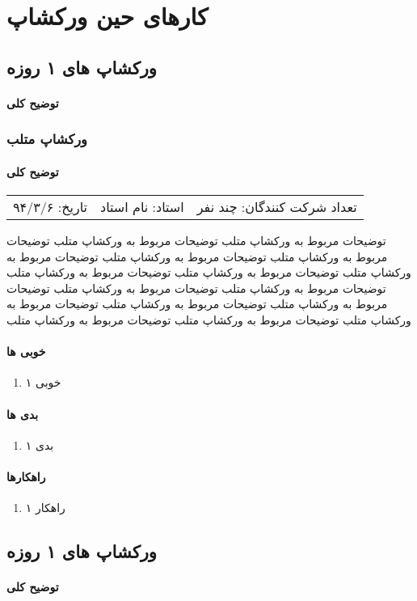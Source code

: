\chapter{کارهای حین ورکشاپ}

\section{ورکشاپ های ۱ روزه}

\subsubsection{توضیح کلی}


\subsection{ورکشاپ متلب}
\subsubsection{توضیح کلی}
\begin{center}
\begin{tabularx}{\textwidth}{XXX}
تاریخ: ۹۴/۳/۶ & استاد: نام استاد & تعداد شرکت کنندگان: چند نفر
\end{tabularx}
\end{center}
توضیحات مربوط به ورکشاپ متلب توضیحات مربوط به ورکشاپ متلب توضیحات مربوط به ورکشاپ متلب توضیحات مربوط به ورکشاپ متلب توضیحات مربوط به ورکشاپ متلب توضیحات مربوط به ورکشاپ متلب توضیحات مربوط به ورکشاپ متلب توضیحات مربوط به ورکشاپ متلب توضیحات مربوط به ورکشاپ متلب توضیحات مربوط به ورکشاپ متلب توضیحات مربوط به ورکشاپ متلب توضیحات مربوط به ورکشاپ متلب توضیحات مربوط به ورکشاپ متلب توضیحات مربوط به ورکشاپ متلب
\subsubsection{خوبی ها}
\begin{enumerate}
	\item خوبی ۱
\end{enumerate}
\subsubsection{بدی ها}
\begin{enumerate}
	\item بدی ۱
\end{enumerate}
\subsubsection{راهکارها}
\begin{enumerate}
	\item راهکار ۱
\end{enumerate}

\section{ورکشاپ های ۱ روزه}

\subsubsection{توضیح کلی}


